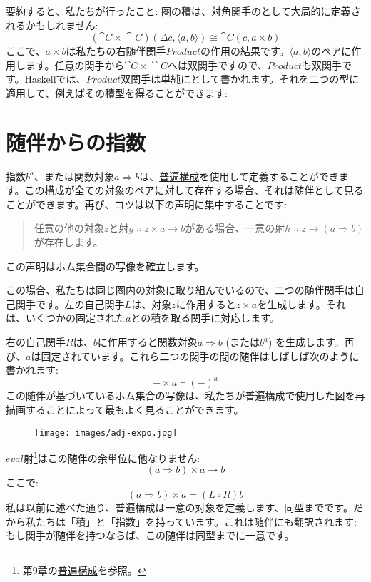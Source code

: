 要約すると、私たちが行ったこと: 圏の積は、対角関手のとして大局的に定義されるかもしれません: 
\[(\cat{C}\times{}\cat{C})(\Delta c, \langle a, b \rangle) \cong \cat{C}(c, a\times{}b)\]
ここで、$a\times{}b$は私たちの右随伴関手$\mathit{Product}$の作用の結果です。$\langle a, b \rangle$のペアに作用します。任意の関手から$\cat{C}\times{}\cat{C}$へは双関手ですので、$\mathit{Product}$も双関手です。Haskellでは、$\mathit{Product}$双関手は単純に\code{(,)}として書かれます。それを二つの型に適用して、例えばその積型を得ることができます: 


\section{随伴からの指数}

指数$b^a$、または関数対象$a \Rightarrow b$は、\hyperref[function-types]{普遍構成}を使用して定義することができます。この構成が全ての対象のペアに対して存在する場合、それは随伴として見ることができます。再び、コツは以下の声明に集中することです: 

\begin{quote}
  任意の他の対象$z$と射$g \Colon z\times{}a \to b$がある場合、一意の射$h \Colon z \to (a \Rightarrow b)$が存在します。
\end{quote}
この声明はホム集合間の写像を確立します。

この場合、私たちは同じ圏内の対象に取り組んでいるので、二つの随伴関手は自己関手です。左の自己関手$L$は、対象$z$に作用すると$z\times{}a$を生成します。それは、いくつかの固定された$a$との積を取る関手に対応します。

右の自己関手$R$は、$b$に作用すると関数対象$a \Rightarrow b$ (または$b^a$) を生成します。再び、$a$は固定されています。これら二つの関手の間の随伴はしばしば次のように書かれます: 
\[-\times{}a \dashv (-)^a\]
この随伴が基づいているホム集合の写像は、私たちが普遍構成で使用した図を再描画することによって最もよく見ることができます。

\begin{figure}[H]
  \centering
  \texttt{[image: images/adj-expo.jpg]}
\end{figure}

\noindent
$\mathit{eval}$射\footnote{第9章の\hyperref[function-types]{普遍構成}を参照。}はこの随伴の余単位に他なりません: 
\[(a \Rightarrow b)\times{}a \to b\]
ここで: 
\[(a \Rightarrow b)\times{}a = (L \circ R) b\]
私は以前に述べた通り、普遍構成は一意の対象を定義します、同型までです。だから私たちは「積」と「指数」を持っています。これは随伴にも翻訳されます: もし関手が随伴を持つならば、この随伴は同型までに一意です。

